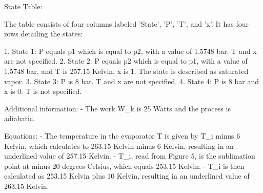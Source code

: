 State Table:

The table consists of four columns labeled 'State', 'P', 'T', and 'x'. It has four rows detailing the states:

1. State 1: P equals p1 which is equal to p2, with a value of 1.5748 bar. T and x are not specified.
2. State 2: P equals p2 which is equal to p1, with a value of 1.5748 bar, and T is 257.15 Kelvin, x is 1. The state is described as saturated vapor.
3. State 3: P is 8 bar. T and x are not specified.
4. State 4: P is 8 bar and x is 0. T is not specified.

Additional information:
- The work W_k is 25 Watts and the process is adiabatic.

Equations:
- The temperature in the evaporator T is given by T_i minus 6 Kelvin, which calculates to 263.15 Kelvin minus 6 Kelvin, resulting in an underlined value of 257.15 Kelvin.
- T_i, read from Figure 5, is the sublimation point at minus 20 degrees Celsius, which equals 253.15 Kelvin.
- T_i is then calculated as 253.15 Kelvin plus 10 Kelvin, resulting in an underlined value of 263.15 Kelvin.